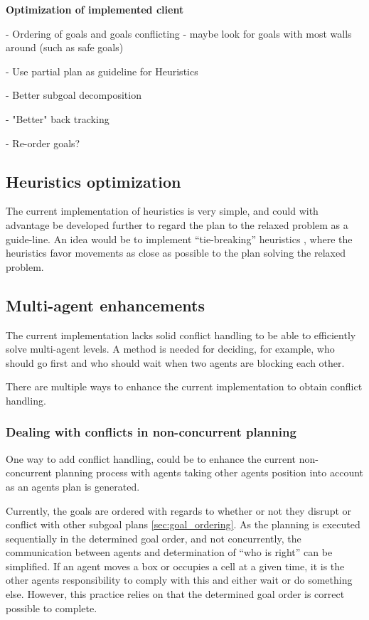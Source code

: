\documentclass[Main]{subfiles}
\begin{document}
\textbf{Optimization of implemented client}


- Ordering of goals and goals conflicting - maybe look for goals with most walls around (such as safe goals)

- Use partial plan as guideline for Heuristics

- Better subgoal decomposition

- "Better" back tracking

- Re-order goals?

\subsection{Heuristics optimization}
The current implementation of heuristics is very simple, and could with advantage be developed further to regard the plan to the relaxed problem as a guide-line. An idea would be to implement ``tie-breaking'' heuristics \citep{stanford2015}, where the heuristics favor movements as close as possible to the plan solving the relaxed problem. 


\subsection{Multi-agent enhancements}

The current implementation lacks solid conflict handling to be able to efficiently solve multi-agent levels.
A method is needed for deciding, for example, who should go first and who should wait when two agents are blocking each other.

There are multiple ways to enhance the current implementation to obtain conflict handling.


\subsubsection{Dealing with conflicts in non-concurrent planning}

One way to add conflict handling, could be to enhance the current non-concurrent planning process with agents taking other agents position into account as an agents plan is generated.

Currently, the goals are ordered with regards to whether or not they disrupt or conflict with other subgoal plans \autoref{sec:goal_ordering}.
As the planning is executed sequentially in the determined goal order, and not concurrently, the communication between agents and determination of ``who is right'' can be simplified.
If an agent moves a box or occupies a cell at a given time, it is the other agents responsibility to comply with this and either wait or do something else.
However, this practice relies on that the determined goal order is correct possible to complete.
\end{document}
